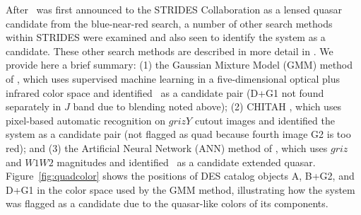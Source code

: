 \documentclass[twocolumn]{aastex6}
\begin{document}
After \sysname\ was first announced to the STRIDES Collaboration as a lensed quasar 
candidate from the blue-near-red search, a number of other search methods within
STRIDES were examined and also seen to identify the system as a candidate.
These other search methods are described in more detail in \cite{agn17}.
We provide here a brief summary: 
(1) the Gaussian Mixture Model (GMM) method of \cite{ostrovski17}, which uses supervised 
machine learning in a five-dimensional optical plus infrared color space and
identified \sysname\ as a candidate pair (D+G1 not found separately in $J$ band due to blending noted above);
(2) CHITAH \citep{chan15}, which uses pixel-based automatic recognition on $grizY$ 
cutout images and identified the system as a candidate pair (not flagged as quad because fourth image G2 is too red);
and (3) the Artificial Neural Network (ANN) method of \cite{agn15a,agn15b}, 
which uses $griz$ and $W1 W2$ magnitudes and identified \sysname\ 
as a candidate extended quasar.  
Figure~\ref{fig:quadcolor} shows the positions of DES catalog objects A, B+G2, and D+G1 
in the color space used by the GMM method, illustrating how the system was flagged as a 
candidate due to the quasar-like colors of its components.


\end{document}
